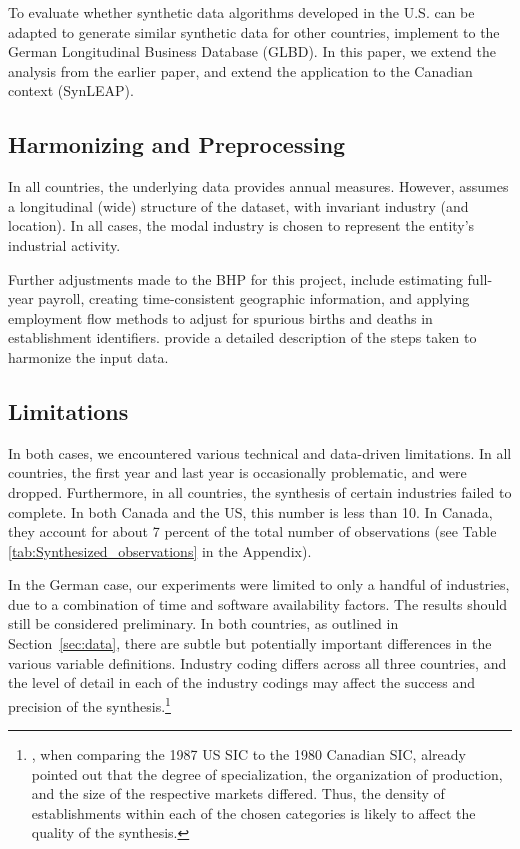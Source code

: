 To evaluate whether synthetic data algorithms developed in the U.S. can be adapted to generate similar synthetic data for other countries, \textcite{RePEc:cen:wpaper:14-13} implement \SynLBD{} to the German Longitudinal Business Database (GLBD). In this paper, we extend the analysis from the earlier paper, and extend the application to the Canadian context (SynLEAP). 


\subsection{Harmonizing and Preprocessing}

In all countries, the underlying data provides annual measures. However, \SynLBD{} assumes a longitudinal (wide) structure of the dataset, with invariant industry (and location). In all cases, the modal industry is chosen to represent the entity's industrial activity. 

Further adjustments made to the \ac{BHP} for this project, include estimating full-year payroll, creating time-consistent geographic information, and applying employment flow methods \citep{RePEc:iab:iabfme:201006_en} to adjust for spurious births and deaths in establishment identifiers. \citet{SJIAOS-2014b} provide a detailed description of the steps taken to harmonize the input data. 

\subsection{Limitations}

In both cases, we encountered various technical and data-driven limitations. In all countries, the first year and last year is occasionally problematic, and were dropped. Furthermore, in all countries, the synthesis of certain industries failed to complete. In both Canada and the US, this number is less than 10. In Canada, they account for about 7 percent of the total number of observations (see Table \ref{tab:Synthesized_observations} in the Appendix).

In the German case, our experiments were limited to only a handful of industries, due to a combination of time and software availability factors. The results should still be considered preliminary. In both countries, as outlined in Section~\ref{sec:data}, there are subtle but potentially important differences in the various variable definitions. Industry coding differs across all three countries, and the level of detail in each of the industry codings may affect the success and precision of the synthesis.\footnote{\textcite{StatisticsCanada1991}, when comparing the 1987 US \ac{SIC} to the 1980 Canadian \ac{SIC},  already pointed out that the degree of specialization, the organization of production, and the size of the respective markets differed. Thus, the density of establishments within each of the chosen categories is likely to affect the quality of the synthesis.} 

